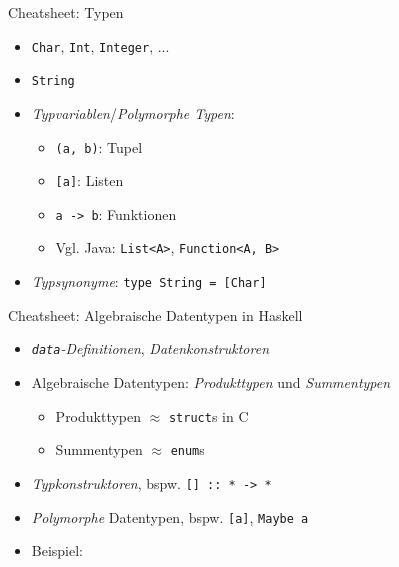 \documentclass{beamer}
\begin{document}
\begin{frame}{Cheatsheet: Typen}
  \begin{itemize}
    \item \texttt{Char}, \texttt{Int}, \texttt{Integer}, ...
    \item \texttt{String}
    \item \emph{Typvariablen}/\emph{Polymorphe Typen}:
    \begin{itemize}
      \item \texttt{(a, b)}: Tupel
      \item \texttt{[a]}: Listen
      \item \texttt{a -> b}: Funktionen
      \item Vgl. Java: \texttt{List<A>}, \texttt{Function<A, B>}
    \end{itemize}
    \item \emph{Typsynonyme}: \texttt{type String = [Char]}
  \end{itemize}
\end{frame}

\begin{frame}{Cheatsheet: Algebraische Datentypen in Haskell}
  \begin{itemize}
    \item \emph{\texttt{data}-Definitionen}, \emph{Datenkonstruktoren}
    \item Algebraische Datentypen: \emph{Produkttypen} und \emph{Summentypen}
    \begin{itemize}
      \item Produkttypen $\approx$ \texttt{struct}s in C
      \item Summentypen $\approx$ \texttt{enum}s
    \end{itemize}
    \item \emph{Typkonstruktoren}, bspw. \texttt{[] :: * -> *}
    \item \emph{Polymorphe} Datentypen, bspw. \texttt{[a]}, \texttt{Maybe a}
    \item Beispiel:
  \end{itemize}
\end{frame}
\end{document}
